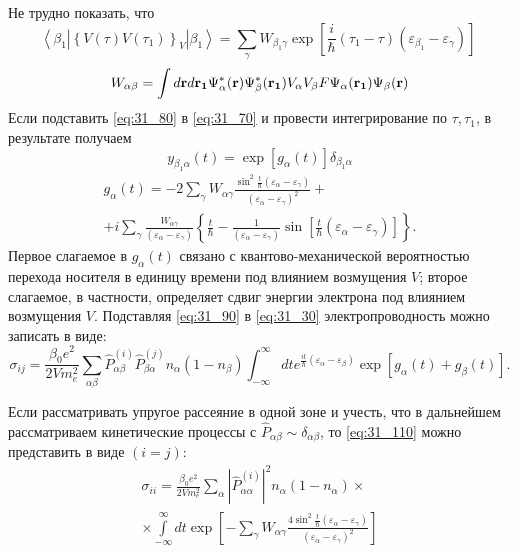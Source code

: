 \noindent Не трудно показать, что
\begin{equation} \label{eq:31_80}
\left\langle {\beta }_1\left|{\left\{V\left(\tau \right)V\left({\tau }_1\right)\right\}}_V\right|{\beta }_1\right\rangle =\sum_{\gamma }{W_{{\beta }_1\gamma }\exp \left[\frac{i}{\hbar }\left({\tau }_1-\tau \right)\left({\varepsilon }_{{\beta }_1}-{\varepsilon }_{\gamma }\right)\right]\ }
\end{equation}
\[
W_{\alpha\beta}=\int{d\boldsymbol{\mathbf{r}} d\boldsymbol{\mathbf{r_1}} \Psi^*_\alpha(\boldsymbol{\mathbf{r}}) \Psi^*_\beta(\boldsymbol{\mathbf{r_1}}) V_\alpha V_\beta F \Psi_\alpha(\boldsymbol{\mathbf{r_1}}) \Psi_\beta(\boldsymbol{\mathbf{r}})}
\] 
Если подставить \eqref{eq:31_80} в \eqref{eq:31_70} и провести интегрирование по $\tau ,{\tau }_1$, в результате получаем
\begin{equation} \label{eq:31_90}
y_{{\beta }_1\alpha}(t)=\exp [g_{\alpha }\left(t\right)]{\delta }_{{\beta }_1\alpha}
\end{equation}
\begin{multline} \label{eq:31_100}
g_{\alpha}(t)=-2\sum_{\gamma}{W_{\alpha \gamma }\frac{{\sin}^2 \frac{t}{\hbar } (\varepsilon_{\alpha} - \varepsilon_{\gamma})}{{(\varepsilon_{\alpha} - \varepsilon_{\gamma})}^2}}+\\
+i\sum_{\gamma }{\frac{W_{\alpha \gamma}}{(\varepsilon_{\alpha} - \varepsilon_{\gamma})}}\left\{\frac{t}{\hbar }-\frac{1}{(\varepsilon_{\alpha} - \varepsilon_{\gamma})}{\sin\left[ \frac{t}{\hbar }(\varepsilon_{\alpha } - \varepsilon_{\gamma})\right] }\right\}.	
\end{multline}
Первое слагаемое в $g_{\alpha }\left(t\right)$ связано с квантово-механической вероятностью перехода носителя в единицу времени под влиянием возмущения $V$; второе слагаемое, в частности, определяет сдвиг энергии электрона под влиянием возмущения $V$.
Подставляя \eqref{eq:31_90} в \eqref{eq:31_30} электропроводность можно записать в виде:
\begin{equation} \label{eq:31_110}
{\sigma }_{ij}=\frac{{\beta }_0e^2}{2Vm^2_e}\sum_{\alpha \beta }{{\hat{P}}^{\left(i\right)}_{\alpha \beta }{\hat{P}}^{\left(j\right)}_{\beta \alpha }n_{\alpha }\left(1-n_{\beta }\right)}\int^{\infty }_{-\infty }{d te^{\frac{it}{\hbar }\left({\varepsilon }_{\alpha }-{\varepsilon }_{\beta }\right)}\exp \left[g_{\alpha }\left(t\right)+g_{\beta }\left(t\right)\right]}.
\end{equation} 

Если рассматривать упругое рассеяние в одной зоне и учесть, что в дальнейшем рассматриваем кинетические процессы с ${\hat{P}}_{\alpha \beta }\sim {\delta }_{\alpha \beta }$, то \eqref{eq:31_110} можно представить в виде $(i=j)$:
\begin{multline} \label{eq:31_120}
{\sigma }_{ii}=\frac{{\beta }_0e^2}{2Vm^2_e}\sum_{\alpha }{{\left|{\hat{P}}^{(i)}_{\alpha \alpha }\right|}^2 n_{\alpha }\left(1-n_{\alpha }\right)}\times\\
\times\int\limits_{- \infty }^\infty {dt \exp \left[-\sum_{\gamma }{W_{\alpha \gamma }\frac{4 \sin^2 \frac{t}{\hbar}\left({\varepsilon }_{\alpha }-{\varepsilon }_{\gamma }\right)}{(\varepsilon_{\alpha } - \varepsilon_{\gamma })^2}}\right]}
\end{multline}

